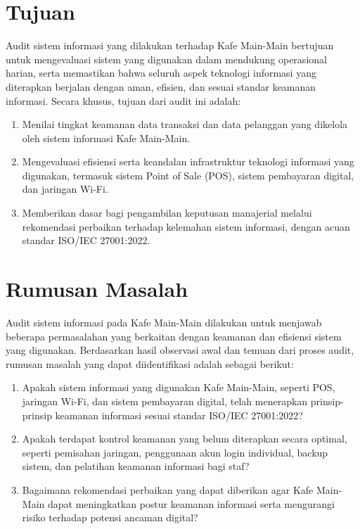 \documentclass[12pt, a4paper]{report}
\begin{document}
\section{Tujuan}

Audit sistem informasi yang dilakukan terhadap Kafe Main-Main bertujuan untuk mengevaluasi sistem yang digunakan dalam mendukung operasional harian, serta memastikan bahwa seluruh aspek teknologi informasi yang diterapkan berjalan dengan aman, efisien, dan sesuai standar keamanan informasi. Secara khusus, tujuan dari audit ini adalah:

\begin{enumerate}
    \item Menilai tingkat keamanan data transaksi dan data pelanggan yang dikelola oleh sistem informasi Kafe Main-Main.
    
    \item Mengevaluasi efisiensi serta keandalan infrastruktur teknologi informasi yang digunakan, termasuk sistem Point of Sale (POS), sistem pembayaran digital, dan jaringan Wi-Fi.
    
    \item Memberikan dasar bagi pengambilan keputusan manajerial melalui rekomendasi perbaikan terhadap kelemahan sistem informasi, dengan acuan standar ISO/IEC 27001:2022.
\end{enumerate}

\section{Rumusan Masalah}

Audit sistem informasi pada Kafe Main-Main dilakukan untuk menjawab beberapa permasalahan yang berkaitan dengan keamanan dan efisiensi sistem yang digunakan. Berdasarkan hasil observasi awal dan temuan dari proses audit, rumusan masalah yang dapat diidentifikasi adalah sebagai berikut:

\begin{enumerate}
    \item Apakah sistem informasi yang digunakan Kafe Main-Main, seperti POS, jaringan Wi-Fi, dan sistem pembayaran digital, telah menerapkan prinsip-prinsip keamanan informasi sesuai standar ISO/IEC 27001:2022?
    
    \item Apakah terdapat kontrol keamanan yang belum diterapkan secara optimal, seperti pemisahan jaringan, penggunaan akun login individual, backup sistem, dan pelatihan keamanan informasi bagi staf?
    
    \item Bagaimana rekomendasi perbaikan yang dapat diberikan agar Kafe Main-Main dapat meningkatkan postur keamanan informasi serta mengurangi risiko terhadap potensi ancaman digital?
\end{enumerate}
\end{document}
